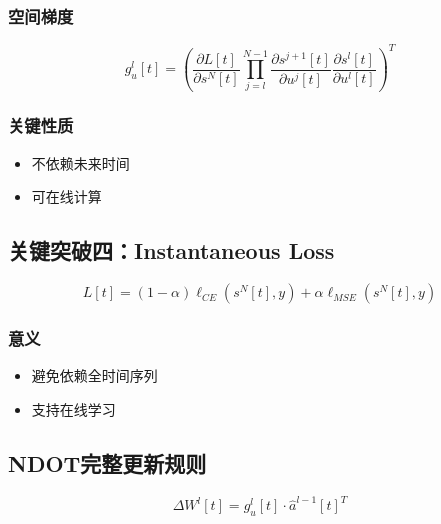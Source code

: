 \documentclass[journal,12pt,onecolumn]{IEEEtran}
\begin{document}
\subsubsection{空间梯度}

\begin{equation}
g_u^l[t]
=
\left(
\frac{\partial L[t]}{\partial s^N[t]}
\prod_{j=l}^{N-1}
\frac{\partial s^{j+1}[t]}{\partial u^j[t]}
\frac{\partial s^l[t]}{\partial u^l[t]}
\right)^T
\end{equation}



\subsubsection{关键性质}

\begin{itemize}
\item 不依赖未来时间
\item 可在线计算
\end{itemize}



\subsection{关键突破四：Instantaneous Loss}

\begin{equation}
L[t]
=
(1-\alpha)\ell_{CE}(s^N[t], y)
+
\alpha \ell_{MSE}(s^N[t], y)
\end{equation}



\subsubsection{意义}

\begin{itemize}
\item 避免依赖全时间序列
\item 支持在线学习
\end{itemize}



\subsection{NDOT完整更新规则}

\begin{equation}
\Delta W^l[t]
=
g_u^l[t] \cdot \hat{a}^{l-1}[t]^T
\end{equation}
\end{document}
